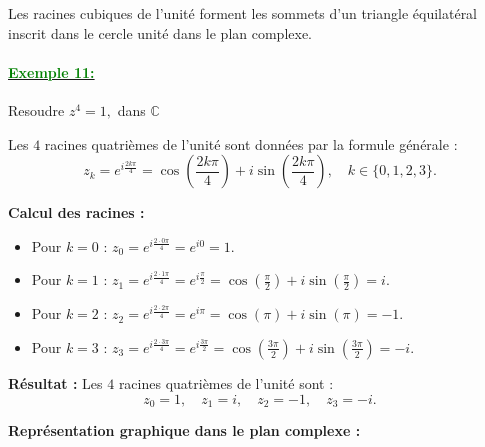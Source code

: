 \documentclass[12pt,a4paper]{article}
\begin{document}
Les racines cubiques de l'unité forment les sommets d'un triangle équilatéral inscrit dans le cercle unité dans le plan complexe.


\paragraph{\underline{\textbf{\textcolor{green}{Exemple 11: }}}}

Resoudre \( z^4 = 1, \) dans $\mathbb{C}$

Les \(4\) racines quatrièmes de l’unité sont données par la formule générale :
\[
z_k = e^{i\frac{2k\pi}{4}} = \cos\left(\frac{2k\pi}{4}\right) + i\sin\left(\frac{2k\pi}{4}\right), \quad k \in \{0, 1, 2, 3\}.
\]

\textbf{Calcul des racines :}
\begin{itemize}
    \item Pour \(k = 0\) : 
    \(
    z_0 = e^{i\frac{2\cdot 0\pi}{4}} = e^{i0} = 1.
    \)
    \item Pour \(k = 1\) : 
    \(
    z_1 = e^{i\frac{2\cdot 1\pi}{4}} = e^{i\frac{\pi}{2}} = \cos\left(\frac{\pi}{2}\right) + i\sin\left(\frac{\pi}{2}\right) = i.
    \)
    \item Pour \(k = 2\) : 
    \(
    z_2 = e^{i\frac{2\cdot 2\pi}{4}} = e^{i\pi} = \cos(\pi) + i\sin(\pi) = -1.
    \)
    \item Pour \(k = 3\) : 
    \(
    z_3 = e^{i\frac{2\cdot 3\pi}{4}} = e^{i\frac{3\pi}{2}} = \cos\left(\frac{3\pi}{2}\right) + i\sin\left(\frac{3\pi}{2}\right) = -i.
    \)
\end{itemize}

\textbf{Résultat :} Les \(4\) racines quatrièmes de l’unité sont :
\[
z_0 = 1, \quad z_1 = i, \quad z_2 = -1, \quad z_3 = -i.
\]

\textbf{Représentation graphique dans le plan complexe :}

\begin{center}
\end{center}
\end{document}
